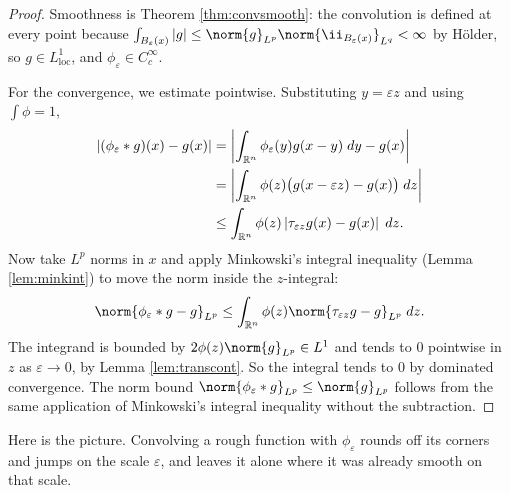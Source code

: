 \documentclass[a4paper]{scrartcl}
\begin{document}
\begin{proof}
	Smoothness is Theorem \ref{thm:convsmooth}: the convolution is defined at every point because $\int_{B_\varepsilon(x)} |g| \le \norm{g}_{L^p}\norm{\ii_{B_\varepsilon(x)}}_{L^q} < \infty$ by H\"older, so $g \in L^1_{\mathrm{loc}}$, and $\phi_\varepsilon \in C_c^\infty$.

	For the convergence, we estimate pointwise. Substituting $y = \varepsilon z$ and using $\int \phi = 1$,
	\begin{align*}
		|(\phi_\varepsilon * g)(x) - g(x)| &= \left| \int_{\mathbb{R}^n} \phi_\varepsilon(y) g(x - y) \; d y - g(x) \right| \\
		&= \left| \int_{\mathbb{R}^n} \phi(z) \big( g(x - \varepsilon z) - g(x)\big) \; d z \right| \\
		&\le \int_{\mathbb{R}^n} \phi(z) \left| \tau_{\varepsilon z} g(x) - g(x) \right| \; d z.
	\end{align*}
	Now take $L^p$ norms in $x$ and apply Minkowski's integral inequality (Lemma \ref{lem:minkint}) to move the norm inside the $z$-integral:
	$$\norm{\phi_\varepsilon * g - g}_{L^p} \le \int_{\R^n} \phi(z) \norm{\tau_{\varepsilon z} g - g}_{L^p} \dd z.$$
	The integrand is bounded by $2\phi(z)\norm{g}_{L^p} \in L^1$ and tends to $0$ pointwise in $z$ as $\varepsilon \to 0$, by Lemma \ref{lem:transcont}. So the integral tends to $0$ by dominated convergence. The norm bound $\norm{\phi_\varepsilon * g}_{L^p} \le \norm{g}_{L^p}$ follows from the same application of Minkowski's integral inequality without the subtraction.
\end{proof}

Here is the picture. Convolving a rough function with $\phi_\varepsilon$ rounds off its corners and jumps on the scale $\varepsilon$, and leaves it alone where it was already smooth on that scale.

\begin{center}
\end{center}
\end{document}
